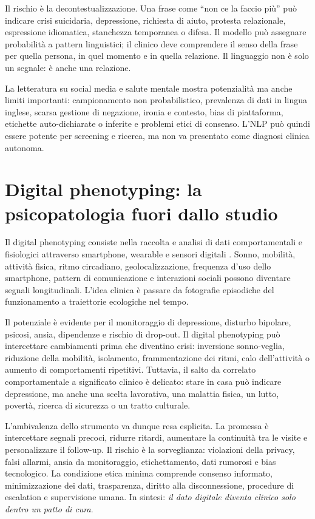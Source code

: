\documentclass[11pt,a4paper]{article}
\begin{document}
Il rischio è la decontestualizzazione. Una frase come ``non ce la faccio più'' può indicare crisi suicidaria, depressione, richiesta di aiuto, protesta relazionale, espressione idiomatica, stanchezza temporanea o difesa. Il modello può assegnare probabilità a pattern linguistici; il clinico deve comprendere il senso della frase per quella persona, in quel momento e in quella relazione. Il linguaggio non è solo un segnale: è anche una relazione.

La letteratura su social media e salute mentale mostra potenzialità ma anche limiti importanti: campionamento non probabilistico, prevalenza di dati in lingua inglese, scarsa gestione di negazione, ironia e contesto, bias di piattaforma, etichette auto-dichiarate o inferite e problemi etici di consenso. L'NLP può quindi essere potente per screening e ricerca, ma non va presentato come diagnosi clinica autonoma.

\section{Digital phenotyping: la psicopatologia fuori dallo studio}
\label{sec:phenotyping}

Il digital phenotyping consiste nella raccolta e analisi di dati comportamentali e fisiologici attraverso smartphone, wearable e sensori digitali \cite{onnela2016,torous2017}. Sonno, mobilità, attività fisica, ritmo circadiano, geolocalizzazione, frequenza d'uso dello smartphone, pattern di comunicazione e interazioni sociali possono diventare segnali longitudinali. L'idea clinica è passare da fotografie episodiche del funzionamento a traiettorie ecologiche nel tempo.

Il potenziale è evidente per il monitoraggio di depressione, disturbo bipolare, psicosi, ansia, dipendenze e rischio di drop-out. Il digital phenotyping può intercettare cambiamenti prima che diventino crisi: inversione sonno-veglia, riduzione della mobilità, isolamento, frammentazione dei ritmi, calo dell'attività o aumento di comportamenti ripetitivi. Tuttavia, il salto da correlato comportamentale a significato clinico è delicato: stare in casa può indicare depressione, ma anche una scelta lavorativa, una malattia fisica, un lutto, povertà, ricerca di sicurezza o un tratto culturale.

L'ambivalenza dello strumento va dunque resa esplicita. La promessa è intercettare segnali precoci, ridurre ritardi, aumentare la continuità tra le visite e personalizzare il follow-up. Il rischio è la sorveglianza: violazioni della privacy, falsi allarmi, ansia da monitoraggio, etichettamento, dati rumorosi e bias tecnologico. La condizione etica minima comprende consenso informato, minimizzazione dei dati, trasparenza, diritto alla disconnessione, procedure di escalation e supervisione umana. In sintesi: \emph{il dato digitale diventa clinico solo dentro un patto di cura}.
\end{document}

